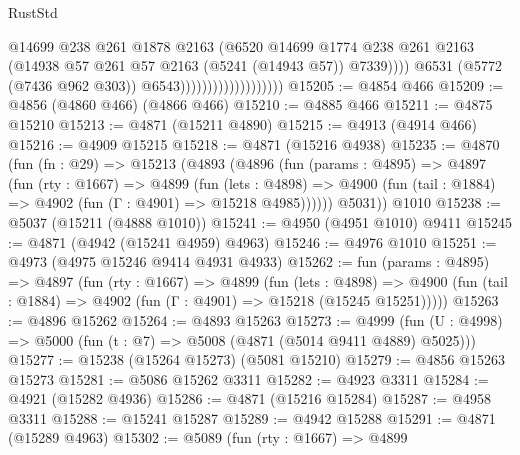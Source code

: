 \begin{lexlean}{RustStd}
\begin{coremodule}
{\begin{coremodule}
{{{{{{{{{{{{{{{{{{{{{{{{{{{{{                                              @14699
                                              @238
                                              @261
                                              @1878
                                              @2163
                                              (@6520
                                                @14699
                                                @1774
                                                @238
                                                @261
                                                @2163
                                                (@14938
                                                  @57
                                                  @261
                                                  @57
                                                  @2163
                                                  (@5241 (@14943 @57))
                                                  @7339))))
                                          @6531
                                          (@5772 (@7436 @962 @303))
                                          @6543)))))))))))))))))))
@15205 := @4854 @466
@15209 := @4856 (@4860 @466) (@4866 @466)
@15210 := @4885 @466
@15211 := @4875 @15210
@15213 := @4871 (@15211 @4890)
@15215 := @4913 (@4914 @466)
@15216 := @4909 @15215
@15218 := @4871 (@15216 @4938)
@15235 := @4870
    (fun (fn : @29) =>
    @15213
      (@4893
        (@4896
          (fun (params : @4895) =>
          @4897
            (fun (rty : @1667) =>
            @4899
              (fun (lets : @4898) =>
              @4900 (fun (tail : @1884) => @4902 (fun (Γ : @4901) => @15218 @4985))))))
        @5031))
    @1010
@15238 := @5037 (@15211 (@4888 @1010))
@15241 := @4950 (@4951 @1010) @9411
@15245 := @4871 (@4942 (@15241 @4959) @4963)
@15246 := @4976 @1010
@15251 := @4973 (@4975 @15246 @9414 @4931 @4933)
@15262 := fun (params : @4895) =>
  @4897
    (fun (rty : @1667) =>
    @4899
      (fun (lets : @4898) =>
      @4900 (fun (tail : @1884) => @4902 (fun (Γ : @4901) => @15218 (@15245 @15251)))))
@15263 := @4896 @15262
@15264 := @4893 @15263
@15273 := @4999 (fun (U : @4998) => @5000 (fun (t : @7) => @5008 (@4871 (@5014 @9411 @4889) @5025)))
@15277 := @15238 (@15264 @15273) (@5081 @15210)
@15279 := @4856 @15263 @15273
@15281 := @5086 @15262 @3311
@15282 := @4923 @3311
@15284 := @4921 (@15282 @4936)
@15286 := @4871 (@15216 @15284)
@15287 := @4958 @3311
@15288 := @15241 @15287
@15289 := @4942 @15288
@15291 := @4871 (@15289 @4963)
@15302 := @5089
    (fun (rty : @1667) =>
    @4899
}}}}}}}}}}}}}}}}}}}}}}}}}}}}}
\end{coremodule}}
\end{coremodule}
\end{lexlean}
